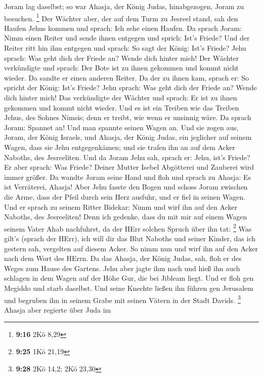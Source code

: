 Joram lag daselbst; so war Ahasja, der König Judas, hinabgezogen, Joram
zu besuchen. \footnote{\textbf{9:16} 2Kö 8,29}  Der Wächter
aber, der auf dem Turm zu Jesreel stand, sah den Haufen Jehus kommen und
sprach: Ich sehe einen Haufen. Da sprach Joram: Nimm einen Reiter und
sende ihnen entgegen und sprich: Ist's Friede?  Und der
Reiter ritt hin ihm entgegen und sprach: So sagt der König: Ist's
Friede? Jehu sprach: Was geht dich der Friede an? Wende dich hinter
mich! Der Wächter verkündigte und sprach: Der Bote ist zu ihnen gekommen
und kommt nicht wieder.  Da sandte er einen anderen Reiter.
Da der zu ihnen kam, sprach er: So spricht der König: Ist's Friede? Jehu
sprach: Was geht dich der Friede an? Wende dich hinter mich!
 Das verkündigte der Wächter und sprach: Er ist zu ihnen
gekommen und kommt nicht wieder. Und es ist ein Treiben wie das Treiben
Jehus, des Sohnes Nimsis; denn er treibt, wie wenn er unsinnig wäre.
 Da sprach Joram: Spannet an! Und man spannte seinen Wagen
an. Und sie zogen aus, Joram, der König Israels, und Ahasja, der König
Judas, ein jeglicher auf seinem Wagen, dass sie Jehu entgegenkämen; und
sie trafen ihn an auf dem Acker Naboths, des Jesreeliten. 
Und da Joram Jehu sah, sprach er: Jehu, ist's Friede? Er aber sprach:
Was Friede? Deiner Mutter Isebel Abgötterei und Zauberei wird immer
größer.  Da wandte Joram seine Hand und floh und sprach zu
Ahasja: Es ist Verräterei, Ahasja!  Aber Jehu fasste den
Bogen und schoss Joram zwischen die Arme, dass der Pfeil durch sein Herz
ausfuhr, und er fiel in seinen Wagen.  Und er sprach zu
seinem Ritter Bidekar: Nimm und wirf ihn auf den Acker Naboths, des
Jesreeliten! Denn ich gedenke, dass du mit mir auf einem Wagen seinem
Vater Ahab nachfuhrst, da der HErr solchen Spruch über ihn tat:
\footnote{\textbf{9:25} 1Kö 21,19}  Was gilt's (sprach der
HErr), ich will dir das Blut Naboths und seiner Kinder, das ich gestern
sah, vergelten auf diesem Acker. So nimm nun und wirf ihn auf den Acker
nach dem Wort des HErrn.  Da das Ahasja, der König Judas,
sah, floh er des Weges zum Hause des Gartens. Jehu aber jagte ihm nach
und hieß ihn auch schlagen in dem Wagen auf der Höhe Gur, die bei
Jibleam liegt. Und er floh gen Megiddo und starb daselbst. 
Und seine Knechte ließen ihn führen gen Jerusalem und begruben ihn in
seinem Grabe mit seinen Vätern in der Stadt Davids. \footnote{\textbf{9:28}
  2Kö 14,2; 2Kö 23,30}  Ahasja aber regierte über Juda im
